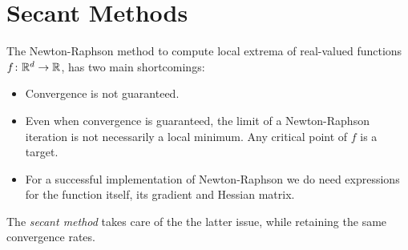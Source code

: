 
\section{Secant Methods}
The Newton-Raphson method to compute local extrema of real-valued functions $f \colon \mathbb{R}^d \to \mathbb{R}$, has two main shortcomings: 
\begin{itemize}
	\item Convergence is not guaranteed.
	\item Even when convergence is guaranteed, the limit of a Newton-Raphson iteration is not necessarily a local minimum.  Any critical point of $f$ is a target.
	\item For a successful implementation of Newton-Raphson we do need expressions for the function itself, its gradient and Hessian matrix.  
\end{itemize}
The \emph{secant method} takes care of the the latter issue, while retaining the same convergence rates.

